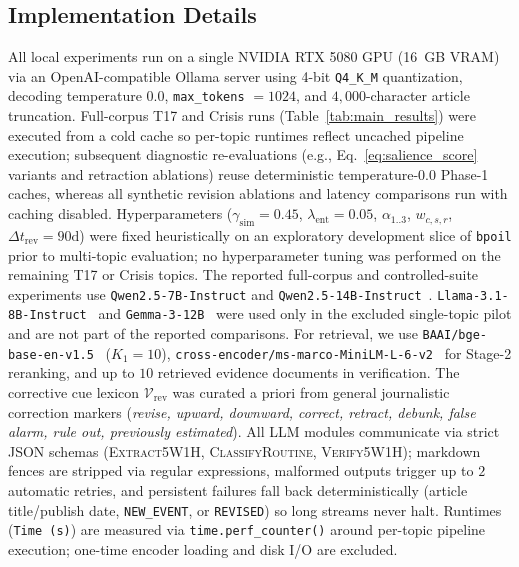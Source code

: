 \documentclass[journal]{IEEEtran}
\begin{document}
\subsection{Implementation Details}
\label{subsec:implementation}

All local experiments run on a single NVIDIA RTX 5080 GPU (16~GB VRAM) via an OpenAI-compatible Ollama server using 4-bit \texttt{Q4\_K\_M} quantization, decoding temperature $0.0$, \texttt{max\_tokens} $= 1024$, and $4{,}000$-character article truncation. Full-corpus T17 and Crisis runs (Table~\ref{tab:main_results}) were executed from a cold cache so per-topic runtimes reflect uncached pipeline execution; subsequent diagnostic re-evaluations (e.g., Eq.~\eqref{eq:salience_score} variants and retraction ablations) reuse deterministic temperature-$0.0$ Phase-1 caches, whereas all synthetic revision ablations and latency comparisons run with caching disabled. Hyperparameters ($\gamma_{\text{sim}}=0.45$, $\lambda_{\text{ent}}=0.05$, $\alpha_{1..3}$, $w_{c,s,r}$, $\Delta t_{\text{rev}}=90\text{d}$) were fixed heuristically on an exploratory development slice of \texttt{bpoil} prior to multi-topic evaluation; no hyperparameter tuning was performed on the remaining T17 or Crisis topics. The reported full-corpus and controlled-suite experiments use \texttt{Qwen2.5-7B-Instruct} and \texttt{Qwen2.5-14B-Instruct}~\cite{qwen25}. \texttt{Llama-3.1-8B-Instruct}~\cite{llama3} and \texttt{Gemma-3-12B}~\cite{gemma3} were used only in the excluded single-topic pilot and are not part of the reported comparisons. For retrieval, we use \texttt{BAAI/bge-base-en-v1.5}~\cite{xiao2024cpack} ($K_1 = 10$), \texttt{cross-encoder/ms-marco-MiniLM-L-6-v2}~\cite{wang2020minilm, nguyen2016msmarco} for Stage-2 reranking, and up to $10$ retrieved evidence documents in verification. The corrective cue lexicon $\mathcal{V}_{\text{rev}}$ was curated a priori from general journalistic correction markers (\textit{revise, upward, downward, correct, retract, debunk, false alarm, rule out, previously estimated}). All LLM modules communicate via strict JSON schemas (\textsc{Extract5W1H}, \textsc{ClassifyRoutine}, \textsc{Verify5W1H}); markdown fences are stripped via regular expressions, malformed outputs trigger up to $2$ automatic retries, and persistent failures fall back deterministically (article title/publish date, \texttt{NEW\_EVENT}, or \texttt{REVISED}) so long streams never halt. Runtimes (\texttt{Time (s)}) are measured via \texttt{time.perf\_counter()} around per-topic pipeline execution; one-time encoder loading and disk I/O are excluded.
\end{document}
